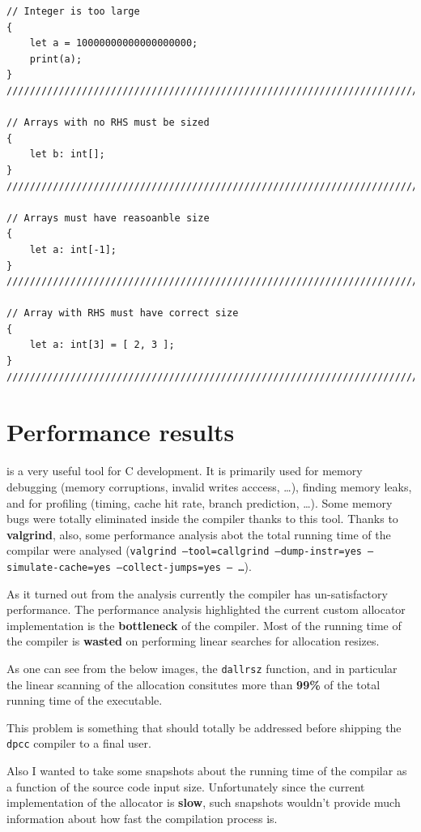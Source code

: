 \documentclass[a4paper]{article}
\newcommand{\urlref}[3][blue]{\href{#2}{\color{#1}{#3}}}%
\begin{document}
\begin{lstlisting}[language=DPL]
// Integer is too large
{
    let a = 10000000000000000000;
    print(a);
}
///////////////////////////////////////////////////////////////////////////////

// Arrays with no RHS must be sized
{
    let b: int[];
}
///////////////////////////////////////////////////////////////////////////////

// Arrays must have reasoanble size
{
    let a: int[-1];
}
///////////////////////////////////////////////////////////////////////////////

// Array with RHS must have correct size
{
    let a: int[3] = [ 2, 3 ];
}
///////////////////////////////////////////////////////////////////////////////
\end{lstlisting}


\clearpage

\section{Performance results}

\urlref{https://www.valgrind.org/}{Valgrind} is a very useful tool for C development. It is primarily used for
memory debugging (memory corruptions, invalid writes acccess, \dots), finding memory leaks, and for
profiling (timing, cache hit rate, branch prediction, \dots). Some memory bugs were totally eliminated
inside the compiler thanks to this tool. Thanks to \textbf{valgrind}, also, some performance analysis abot the
total running time of the compilar were analysed (\texttt{valgrind --tool=callgrind --dump-instr=yes --simulate-cache=yes --collect-jumps=yes -- \dots}).

As it turned out from the analysis currently the compiler has un-satisfactory performance. The performance analysis
highlighted the current custom allocator implementation is the \textbf{bottleneck} of the compiler. Most
of the running time of the compiler is \textbf{wasted} on performing linear searches for allocation resizes.

As one can see from the below images, the \texttt{dallrsz} function, and in particular the linear scanning of the allocation
consitutes more than \textbf{99\%} of the total running time of the executable.

This problem is something that should totally be addressed before shipping the \texttt{dpcc} compiler to a final user.

Also I wanted to take some snapshots about the running time of the compilar as a function of the  source code input
size. Unfortunately since the current implementation of the allocator is \textbf{slow}, such snapshots
wouldn't provide much information about how fast the compilation process is.
\end{document}
